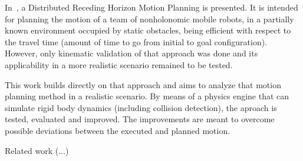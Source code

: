 \documentclass[letterpaper, 10 pt, conference]{ieeeconf}  %
\begin{document}
In~\cite{MendesFilho2015}, a Distributed Receding Horizon Motion Planning is presented. It is intended for planning the motion of a team of nonholonomic mobile robots, in a partially known environment occupied by static obstacles, being efficient with respect to the travel time (amount of time to go from initial to goal configuration). However, only kinematic validation of that approach was done and its applicability in a more realistic scenario remained to be tested.

This work builds directly on that approach and aims to analyze that motion planning method in a realistic scenario. By means of a physics engine that can simulate rigid body dynamics (including collision detection), the aproach is tested, evaluated and improved. The improvements are meant to
overcome possible deviations between the executed and planned motion.

Related work (...)






\end{document}

